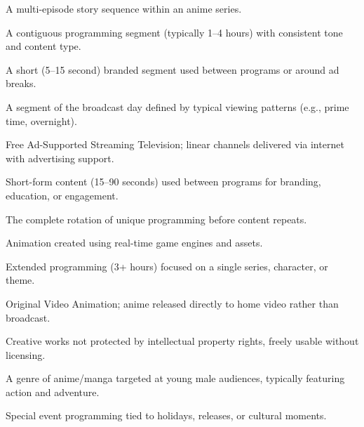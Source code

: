 \documentclass[12pt,letterpaper,twoside]{report}
\begin{document}
\begin{description}[leftmargin=2cm, style=nextline]
    \item[Arc] A multi-episode story sequence within an anime series.
    \item[Block] A contiguous programming segment (typically 1--4 hours) with consistent tone and content type.
    \item[Bumper] A short (5--15 second) branded segment used between programs or around ad breaks.
    \item[Daypart] A segment of the broadcast day defined by typical viewing patterns (e.g., prime time, overnight).
    \item[FAST] Free Ad-Supported Streaming Television; linear channels delivered via internet with advertising support.
    \item[Interstitial] Short-form content (15--90 seconds) used between programs for branding, education, or engagement.
    \item[Loop] The complete rotation of unique programming before content repeats.
    \item[Machinima] Animation created using real-time game engines and assets.
    \item[Marathon] Extended programming (3+ hours) focused on a single series, character, or theme.
    \item[OVA] Original Video Animation; anime released directly to home video rather than broadcast.
    \item[Public Domain] Creative works not protected by intellectual property rights, freely usable without licensing.
    \item[Shonen] A genre of anime/manga targeted at young male audiences, typically featuring action and adventure.
    \item[Stunt Programming] Special event programming tied to holidays, releases, or cultural moments.
\end{description}

\end{document}
